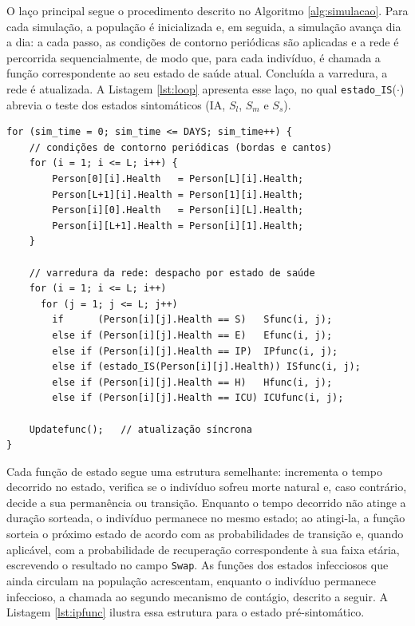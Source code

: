 \documentclass[
	12pt,				%
	openright,			%
	oneside,			%
	a4paper,			%
	english,			%
	french,				%
	spanish,			%
	brazil				%
	]{abntex2}
\begin{document}
O laço principal segue o procedimento descrito no Algoritmo \ref{alg:simulacao}. Para cada simulação, a população é inicializada e, em seguida, a simulação avança dia a dia: a cada passo, as condições de contorno periódicas são aplicadas e a rede é percorrida sequencialmente, de modo que, para cada indivíduo, é chamada a função correspondente ao seu estado de saúde atual. Concluída a varredura, a rede é atualizada. A Listagem \ref{lst:loop} apresenta esse laço, no qual \texttt{estado\_IS}($\cdot$) abrevia o teste dos estados sintomáticos (IA, $S_l$, $S_m$ e $S_s$).

\begin{lstlisting}[caption={Laço principal: contorno periódico, varredura e atualização.}, label={lst:loop}]
for (sim_time = 0; sim_time <= DAYS; sim_time++) {
    // condições de contorno periódicas (bordas e cantos)
    for (i = 1; i <= L; i++) {
        Person[0][i].Health   = Person[L][i].Health;
        Person[L+1][i].Health = Person[1][i].Health;
        Person[i][0].Health   = Person[i][L].Health;
        Person[i][L+1].Health = Person[i][1].Health;
    }

    // varredura da rede: despacho por estado de saúde
    for (i = 1; i <= L; i++)
      for (j = 1; j <= L; j++)
        if      (Person[i][j].Health == S)   Sfunc(i, j);
        else if (Person[i][j].Health == E)   Efunc(i, j);
        else if (Person[i][j].Health == IP)  IPfunc(i, j);
        else if (estado_IS(Person[i][j].Health)) ISfunc(i, j);
        else if (Person[i][j].Health == H)   Hfunc(i, j);
        else if (Person[i][j].Health == ICU) ICUfunc(i, j);

    Updatefunc();   // atualização síncrona
}
\end{lstlisting}

Cada função de estado segue uma estrutura semelhante: incrementa o tempo decorrido no estado, verifica se o indivíduo sofreu morte natural e, caso contrário, decide a sua permanência ou transição. Enquanto o tempo decorrido não atinge a duração sorteada, o indivíduo permanece no mesmo estado; ao atingi-la, a função sorteia o próximo estado de acordo com as probabilidades de transição e, quando aplicável, com a probabilidade de recuperação correspondente à sua faixa etária, escrevendo o resultado no campo \texttt{Swap}. As funções dos estados infecciosos que ainda circulam na população acrescentam, enquanto o indivíduo permanece infeccioso, a chamada ao segundo mecanismo de contágio, descrito a seguir. A Listagem \ref{lst:ipfunc} ilustra essa estrutura para o estado pré-sintomático.
\end{document}
